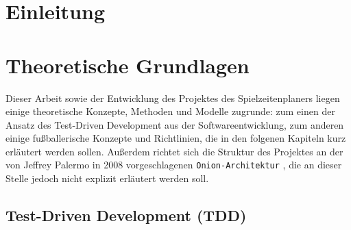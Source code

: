 %
%





\section{Einleitung}



\pagebreak


\section{Theoretische Grundlagen}

Dieser Arbeit sowie der Entwicklung des Projektes des Spielzeitenplaners liegen 
einige theoretische Konzepte, Methoden und Modelle zugrunde: zum einen der Ansatz des 
Test-Driven Development aus der Softwareentwicklung, zum anderen einige fußballerische 
Konzepte und Richtlinien, die in den folgenen Kapiteln kurz erläutert werden sollen. 
Außerdem richtet sich die Struktur des Projektes an der von Jeffrey Palermo in 2008 
vorgeschlagenen \texttt{Onion-Architektur} \cite{palermo2008onion}, die an dieser 
Stelle jedoch nicht explizit erläutert werden soll. 


\subsection{Test-Driven Development (TDD)}




